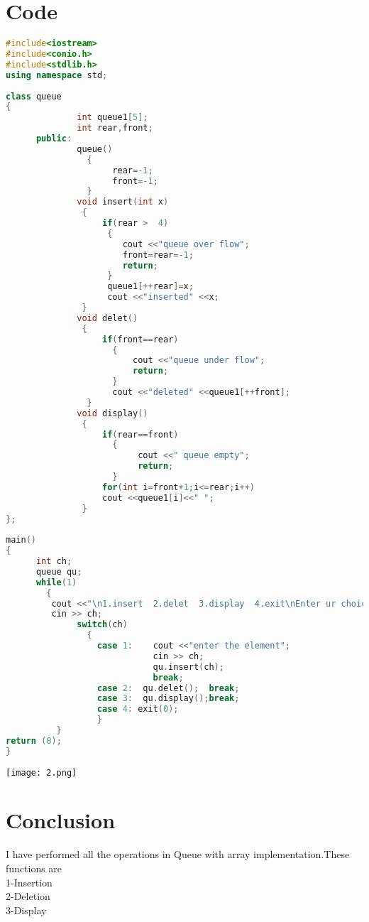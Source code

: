 \documentclass[11pt]{article}            %
\begin{document}
\section{Code} 
\begin{lstlisting}[language=C++]
#include<iostream>
#include<conio.h>
#include<stdlib.h>
using namespace std;
 
class queue
{
              int queue1[5];
              int rear,front;
      public:
              queue()
                {
                     rear=-1;
                     front=-1;
                }
              void insert(int x)
               {
                   if(rear >  4)
                    {
                       cout <<"queue over flow";
                       front=rear=-1;
                       return;
                    }
                    queue1[++rear]=x;
                    cout <<"inserted" <<x;
               }
              void delet()
               {
                   if(front==rear)
                     {
                         cout <<"queue under flow";
                         return;
                     }
                     cout <<"deleted" <<queue1[++front];
                }
              void display()
               {
                   if(rear==front)
                     {
                          cout <<" queue empty";
                          return;
                     }
                   for(int i=front+1;i<=rear;i++)
                   cout <<queue1[i]<<" ";
               }
};
 
main()
{
      int ch;
      queue qu;
      while(1)
        {
         cout <<"\n1.insert  2.delet  3.display  4.exit\nEnter ur choice";
         cin >> ch;
              switch(ch)
                {
                  case 1:    cout <<"enter the element";
                           	 cin >> ch;
                             qu.insert(ch);
                             break;
                  case 2:  qu.delet();  break;
                  case 3:  qu.display();break;
                  case 4: exit(0);
                  }
          }
return (0);
}
\end{lstlisting} 
 
\begin{figure*}
\centering
  \texttt{[image: 2.png]}
\caption{Queue with Array implementation}
\label{Figure:2}    
\end{figure*}
\section{Conclusion} 
I have performed all the operations in Queue with array implementation.These functions are\\ 
1-Insertion\\
2-Deletion\\
3-Display\\
\end{document}
